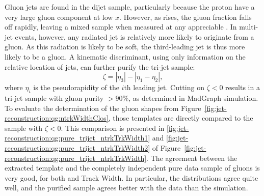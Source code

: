 Gluon jets are found in the dijet sample, particularly because the proton have a very large gluon component at low $x$. However, as \pt rises, the gluon fraction falls off rapidly, leaving a mixed sample when measured at any appreciable \pt. In multi-jet events, however, any radiated jet is relatively more likely to originate from a gluon. As this radiation is likely to be soft, the third-leading jet is thus more likely to be a gluon. A kinematic discriminant, using only information on the relative location of jets, can further purify the tri-jet sample: 
%
\begin{equation}
\zeta=|\eta_3|-|\eta_1-\eta_2|,
\end{equation}
%
where $\eta_i$ is the pseudorapidity of the $i$th leading jet. Cutting on $\zeta < 0$ results in a tri-jet sample with gluon purity $> 90\%$, as determined in MadGraph simulation. To evaluate the determination of the gluon shapes from Figure~\ref{fig:jet-reconstruction:qg:ntrkWidthClos}, those templates are directly compared to the sample with $\zeta < 0$. This comparison is presented in \ref{fig:jet-reconstruction:qg:pure_trijet_ntrkTrkWidth1} and \ref{fig:jet-reconstruction:qg:pure_trijet_ntrkTrkWidth2} of Figure~\ref{fig:jet-reconstruction:qg:pure_trijet_ntrkTrkWidth}. The agreement between the extracted template and the completely independent pure data sample of gluons is very good, for both \ntrk and Track Width. In particular, the \ntrk distributions agree quite well, and the purified sample agrees better with the data than the \Pythia simulation.

